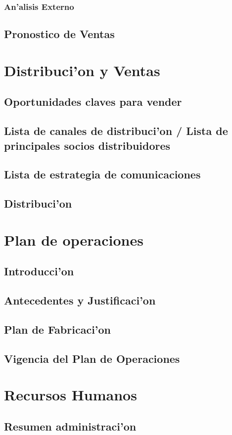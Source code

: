 \documentclass[letterpaper,openright,10pt,oneside]{report}
\begin{document}
			\subsection{An'alisis Externo}
		\section{Pronostico de Ventas}
	\chapter{Distribuci'on y Ventas}
		\section{Oportunidades claves para vender}
		\section{Lista de canales de distribuci'on / Lista de principales socios distribuidores}
		\section{Lista de estrategia de comunicaciones}
		\section{Distribuci'on}
	\chapter{Plan de operaciones}
		\section{Introducci'on}
		\section{Antecedentes y Justificaci'on}
		\section{Plan de Fabricaci'on}
		\section{Vigencia del Plan de Operaciones}
	\chapter{Recursos Humanos}
		\section{Resumen administraci'on}
\end{document}
